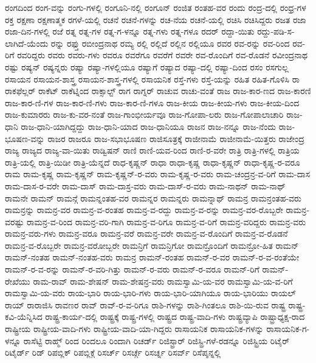 {ರಂಗದಿಂದ
ರಂಗ-ವನ್ನು
ರಂಗು-ಗಳಲ್ಲಿ
ರಂಗೂನಿ-ನಲ್ಲಿ
ರಂಗೂನ್
ರಂಜಿತ
ರಂತಹ-ವರ
ರಂದು
ರಂದ್ರ-ದಲ್ಲಿ
ರಂಧ್ರ-ಗಳ
ರಕ್ತ
ರಕ್ಷಣಾ
ರಕ್ಷಣಾತ್ಮಕ
ರಗಳೆ-ಯಲ್ಲಿ
ರಚನೆ
ರಚನೆ-ಗಳನ್ನು
ರಚ-ನೆಯ
ರಚನೆ-ಯಲ್ಲಿ
ರಚಿಸಿ
ರಚಿಸಿದ್ದರು
ರಜತ
ರಜಾ
ರಜಾ-ದಿನ-ಗಳಲ್ಲಿ
ರಜೆ
ರತ್ನ
ರತ್ನ-ಗಳ
ರತ್ನ-ಗ-ಳನ್ನೂ
ರತ್ನ-ಗಳು
ರತ್ನ-ಗಳೂ
ರದರ್
ರದ್ದಾ-ಯಿತು
ರದ್ದು-ಪಡಿ-ಸ-ಲಾಗಿದೆ-ಯೆಂದು
ರನ್ನು
ರಫ್ತು
ರಬೀಂದ್ರನಾಥ
ರಮ್ಯ
ರಲ್ಲಿ
ರಲ್ಲಿದೆ
ರಲ್ಲಿನ
ರಲ್ಲಿಯೂ
ರವರ
ರವ-ರನ್ನು
ರವ-ರಿಂದ
ರವ-ರಿಗೆ
ರವರಿದ್ದರು
ರವರು
ರವರು-ಗಳು
ರವರೂ
ರವರೆಗೂ
ರವರೆಗೆ
ರವರೇ
ರವ-ರೊಂದಿಗೆ
ರವ-ರೊಡನೆ
ರವೀಂದ್ರನಾಥ
ರಷ್ಟು
ರಷ್ಯನ್
ರಷ್ಯನ್ನರು
ರಷ್ಯಾ
ರಷ್ಯಾ-ಗಳಲ್ಲಿಯೂ
ರಷ್ಯಾಗೆ
ರಷ್ಯಾದ
ರಷ್ಯಾ-ದಲ್ಲಿ
ರಷ್ಯಾ-ದಿಂದ
ರಸಂ
ರಸಗುಲ್ಲ
ರಸಾಯನ
ರಸಾಯನ-ಶಾಸ್ತ್ರ
ರಸಾಯನ-ಶಾಸ್ತ್ರ-ಗಳಲ್ಲಿ
ರಸಾಯನಿಕ
ರಸ್ತೆ-ಗಳು
ರಸ್ತೆ-ಯನ್ನು
ರಹಿತ
ರಹಿತ-ಗೊಳಿಸಿ
ರಾ
ರಾಕಫೆಲ್ಲರ್
ರಾಕೆಟ್
ರಾಕೆಟ್ನಿಂದ
ರಾಕ್ಸಾಲ್ಟ್
ರಾಗ
ರಾಗ್ನರ್
ರಾಚುವ
ರಾಚು-ವಂತೆ
ರಾಜ
ರಾಜ-ಕಾರ-ಣದ
ರಾಜ-ಕಾರಣಿ
ರಾಜ-ಕಾರ-ಣಿ-ಗಳ
ರಾಜ-ಕಾರ-ಣಿ-ಗಳು
ರಾಜ-ಕಾರ-ಣಿ-ಗಳೂ
ರಾಜ-ಕೀಯ
ರಾಜ-ಕೀಯ-ಗಳು
ರಾಜ-ಕೀಯ-ದಿಂದ
ರಾಜ-ಕುಮಾರರು
ರಾಜ-ಕು-ವರ-ನಂತೆ
ರಾಜ-ಗಾಂಭೀರ್ಯವೂ
ರಾಜ-ಗೋಪಾ-ಲರು
ರಾಜ-ಗೋಪಾಲಾಚಾರಿ
ರಾಜ-ಧಾನಿ
ರಾಜ-ಧಾನಿ-ಯಾಗಿದ್ದದ್ದು
ರಾಜ-ಧಾನಿ-ಯಾದ
ರಾಜ-ಧಾನಿಯೂ
ರಾಜನ
ರಾಜ-ನನ್ನೂ
ರಾಜ-ನೆಂದು
ರಾಜ-ಭೂಷಣ-ವನ್ನು
ರಾಜರ
ರಾಜರೂ
ರಾಜ-ಸಭಾಭೂಷಣ
ರಾಜಿಸೂತ್ರಕ್ಕೆ
ರಾಜೀನಾಮೆ
ರಾಜೀನಾಮೆ-ಯಿತ್ತರು
ರಾಜೇಂದ್ರ
ರಾಜ್ಯ
ರಾಜ್ಯದ
ರಾಜ್ಯ-ವಾ-ಯಿತು
ರಾಡ್ವಿಷನ್
ರಾಣಿ
ರಾಣಿ-ಯವ-ರಿಂದ
ರಾಣಿ-ರ-ವರೇ
ರಾತ್ರಿ
ರಾತ್ರಿ-ಗಳಲ್ಲಿ
ರಾತ್ರಿಯ
ರಾತ್ರಿ-ಯಲ್ಲಿ
ರಾತ್ರಿ-ಯಿಡೀ
ರಾತ್ರಿ-ಯೆನ್ನದೆ
ರಾಧ-ಕೃಷ್ಣನ್
ರಾಧಾ
ರಾಧಾ-ಕೃಷ್ಣ
ರಾಧಾ-ಕೃಷ್ಣನ್
ರಾಧಾ-ಕೃಷ್ಣ-ರ-ವರೂ
ರಾಮ
ರಾಮ-ಕೃಷ್ಣ
ರಾಮ-ಕೃಷ್ಣನ್
ರಾಮ-ಕೃಷ್ಣನ್-ರ-ವರು
ರಾಮ-ಕೃಷ್ಣ-ರ-ವರು
ರಾಮ-ಚಂದ್ರನ್ರ-ವ-ರಿಗೆ
ರಾಮ-ದಾಸ
ರಾಮ-ದಾಸ-ರ-ವರೇ
ರಾಮ-ದಾಸ್
ರಾಮ-ದಾಸ್ರ-ವರು
ರಾಮ-ದಾಸ್-ರ-ವರು
ರಾಮ-ನಾಥನ್
ರಾಮ-ನಾಥ್
ರಾಮನೇ
ರಾಮನ್
ರಾಮನ್ಗೆ
ರಾಮನ್ನಂತಹ-ವರ
ರಾಮನ್ನರ
ರಾಮನ್ನರು
ರಾಮನ್ನಾಥ್
ರಾಮನ್ರ
ರಾಮನ್ರಂತಹ-ವರು
ರಾಮನ್ರನ್ನು
ರಾಮನ್ರ-ವರ
ರಾಮನ್ರ-ವ-ರಂತಹ
ರಾಮನ್ರ-ವ-ರದ್ದು
ರಾಮನ್ರ-ವ-ರನ್ನು
ರಾಮನ್ರ-ವರ-ರೊಬ್ಬರೇ
ರಾಮನ್ರ-ವರಷ್ಟು
ರಾಮನ್ರ-ವ-ರಿಂದ
ರಾಮನ್ರ-ವರಿ-ಗಾಗಿ
ರಾಮನ್ರ-ವ-ರಿಗೂ
ರಾಮನ್ರ-ವ-ರಿಗೆ
ರಾಮನ್ರ-ವರಿದ್ದರು
ರಾಮನ್ರ-ವರು
ರಾಮನ್ರ-ವರು-ಗಳು
ರಾಮನ್ರ-ವರೂ
ರಾಮನ್ರ-ವರೆ
ರಾಮನ್ರ-ವರೇ
ರಾಮನ್ರ-ವ-ರೊಂದಿಗೆ
ರಾಮನ್ರ-ವ-ರೊಡನೆ
ರಾಮನ್ರ-ವ-ರೊಬ್ಬರೇ
ರಾಮನ್ರ-ವರೋಬ್ಬರೇ
ರಾಮನ್ರಿಗೆ
ರಾಮನ್ರಿಗೋ
ರಾಮನ್ರೊಂದಿಗೆ
ರಾಮನ್ರೋ-ಹಿತ
ರಾಮನ್
ರಾಮನ್-ನಂತಹ
ರಾಮನ್-ನಂತಹ-ವರು
ರಾಮನ್ರ
ರಾಮನ್-ರಂತಹ
ರಾಮನ್-ರ-ವರ
ರಾಮನ್-ರ-ವ-ರಂತೆಯೇ
ರಾಮನ್-ರ-ವ-ರನ್ನು
ರಾಮನ್-ರ-ವರಿ-ಗಿತ್ತು
ರಾಮನ್-ರ-ವರು
ರಾಮನ್-ರ-ವರೂ
ರಾಮನ್-ರಿಗೆ
ರಾಮನ್-ರೇಖೆಯು
ರಾಮ-ರಾವ್
ರಾಮ-ಶೇಷನ್
ರಾಮ-ಶೇಷನ್ರ-ವರು
ರಾಮಸ್ವಾಮಿ-ಯ-ವರ
ರಾಮಸ್ವಾಮಿ-ಯ-ವ-ರಿಗೆ
ರಾಮಸ್ವಾಮಿ-ಯ-ವರು
ರಾಯ-ಭಾರಿ
ರಾಯ-ಭಾರಿ-ಗಳು
ರಾಯ-ಭಾರಿ-ಯಾಗಿಯೂ
ರಾಯ-ಭಾರಿಯು
ರಾಯಲ್
ರಾಯ್
ರಾರಾಜಿಸಿ
ರಾವಣರ
ರಾವ್
ರಾವ್-ರ-ವ-ರಿಗೂ
ರಾಶಿ-ಗಳನ್ನು
ರಾಶಿ-ಗಿಂತಲೂ
ರಾಶಿ-ಯಿ-ರುವ
ರಾಷ್ಟ್ರ
ರಾಷ್ಟ್ರ-ಕವಿ-ಯೆನ್ನಿಸಿದ
ರಾಷ್ಟ್ರ-ಕಾರ್ಯ-ದಲ್ಲಿ
ರಾಷ್ಟ್ರಕ್ಕೆ
ರಾಷ್ಟ್ರ-ಗಳಲ್ಲಿ
ರಾಷ್ಟ್ರದ
ರಾಷ್ಟ್ರ-ವಾದಿ-ಗಳು
ರಾಷ್ಟ್ರವ್ಯಾಪಿ
ರಾಷ್ಟ್ರಾಧ್ಯಕ್ಷ-ರಾದ
ರಾಷ್ಟ್ರೀಯ
ರಾಷ್ಟ್ರೀಯ-ವಾದಿ-ಗಳು
ರಾಷ್ಟ್ರೀಯ-ವಾದಿ-ಯಾ-ಗಿದ್ದರು
ರಾಸಾಯನಿಕ
ರಾಸಾಯನಿಕ-ಗಳನ್ನು
ರಾಸಾಯನಿಕ-ಗ-ಳನ್ನೂ
ರಾಸೆಟ್ಟಿ
ರಾಹ್ಮ್
ರಿಂದ
ರಿಂದಲೂ
ರಿಂದಾಗಿ
ರಿಚರ್ಡ್
ರಿಜಿಸ್ಟ್ರಾರ್
ರಿಜಿಸ್ಟ್ರಿ-ಗಳೆ-ರಡನ್ನೂ
ರಿಜಿಸ್ಟ್ರಿಯ
ರಿಟೈರ್
ರಿಟೈರ್ಡ್
ರಿಡ್
ರಿಪಬ್ಲಿಕ್
ರಿಪಬ್ಲಿಕ್ಗೆ
ರಿಸರ್ಚ್
ರಿಸರ್ಚ್ಗೆ
ರಿಸರ್ಚ್ನ
ರಿಸರ್ವ್
ರಿಸೆಪ್ಶನ್ನಲ್ಲಿ
}
